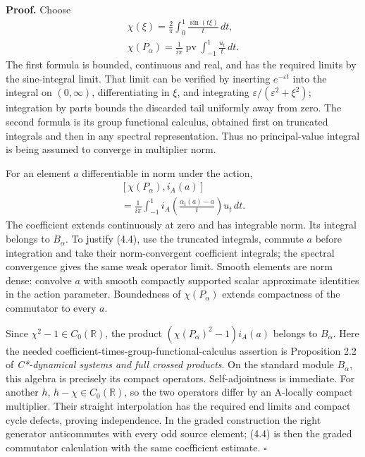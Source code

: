 \documentclass[
  11pt,
]{article}
\begin{document}
\textbf{Proof.} Choose \[
\begin{gathered}
\chi(\xi)=\frac2\pi\int_0^1\frac{\sin(t\xi)}t\,dt,\\
\chi(P_\alpha)
 =\frac1{i\pi}\operatorname{pv}
          \int_{-1}^1\frac{u_t}{t}\,dt.
\end{gathered}
\tag{4.3}
\] The first formula is bounded, continuous and real, and has the
required limits by the sine-integral limit. That limit can be verified
by inserting \(e^{-\varepsilon t}\) into the integral on \((0,\infty)\),
differentiating in \(\xi\), and integrating
\(\varepsilon/(\varepsilon^2+\xi^2)\); integration by parts bounds the
discarded tail uniformly away from zero. The second formula is its group
functional calculus, obtained first on truncated integrals and then in
any spectral representation. Thus no principal-value integral is being
assumed to converge in multiplier norm.

For an element \(a\) differentiable in norm under the action, \[
\begin{gathered}
{}[\chi(P_\alpha),i_A(a)]\\
 =\frac1{i\pi}\int_{-1}^1
       i_A\left(\frac{\alpha_t(a)-a}{t}\right)u_t\,dt.
\end{gathered}
\tag{4.4}
\] The coefficient extends continuously at zero and has integrable norm.
Its integral belongs to \(B_\alpha\). To justify (4.4), use the
truncated integrals, commute \(a\) before integration and take their
norm-convergent coefficient integrals; the spectral convergence gives
the same weak operator limit. Smooth elements are norm dense: convolve
\(a\) with smooth compactly supported scalar approximate identities in
the action parameter. Boundedness of \(\chi(P_\alpha)\) extends
compactness of the commutator to every \(a\).

Since \(\chi^2-1\in C_0(\mathbb R)\), the product
\((\chi(P_\alpha)^2-1)i_A(a)\) belongs to \(B_\alpha\). Here the needed
coefficient-times-group-functional-calculus assertion is Proposition 2.2
of \emph{C*-dynamical systems and full crossed products}. On the
standard module \(B_\alpha\), this algebra is precisely its compact
operators. Self-adjointness is immediate. For another \(h\),
\(h-\chi\in C_0(\mathbb R)\), so the two operators differ by an
A-locally compact multiplier. Their straight interpolation has the
required end limits and compact cycle defects, proving independence. In
the graded construction the right generator anticommutes with every odd
source element; (4.4) is then the graded commutator calculation with the
same coefficient estimate. \(\square\)
\end{document}
